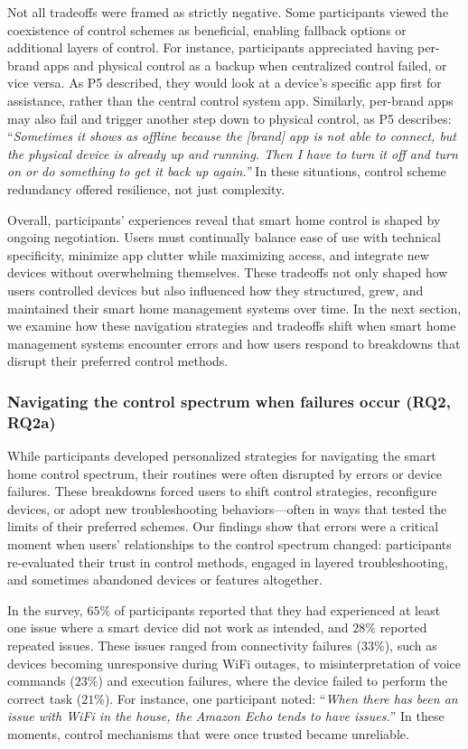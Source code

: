 Not all tradeoffs were framed as strictly negative. Some participants viewed the coexistence of control schemes as beneficial, enabling fallback options or additional layers of control. For instance, participants appreciated having per-brand apps and physical control as a backup when centralized control failed, or vice versa. As P5 described, they would look at a device's specific app first for assistance, rather than the central control system app. Similarly, per-brand apps may also fail and trigger another step down to physical control, as P5 describes: ``\textit{Sometimes it shows as offline because the [brand] app is not able to connect, but the physical device is already up and running. Then I have to turn it off and turn on or do something to get it back up again.''} In these situations, control scheme redundancy offered resilience, not just complexity.

Overall, participants' experiences reveal that smart home control is shaped by ongoing negotiation. Users must continually balance ease of use with technical specificity, minimize app clutter while maximizing access, and integrate new devices without overwhelming themselves. These tradeoffs not only shaped how users controlled devices but also influenced how they structured, grew, and maintained their smart home management systems over time. In the next section, we examine how these navigation strategies and tradeoffs shift when smart home management systems encounter errors and how users respond to breakdowns that disrupt their preferred control methods.

\subsubsection{Navigating the control spectrum when failures occur (RQ2, RQ2a)}
\label{cic:subsec:navigatingcontrol}

While participants developed personalized strategies for navigating the smart home control spectrum, their routines were often disrupted by errors or device failures. These breakdowns forced users to shift control strategies, reconfigure devices, or adopt new troubleshooting behaviors---often in ways that tested the limits of their preferred schemes. Our findings show that errors were a critical moment when users' relationships to the control spectrum changed: participants re-evaluated their trust in control methods, engaged in layered troubleshooting, and sometimes abandoned devices or features altogether.

In the survey, $65\%$ of participants reported that they had experienced at least one issue where a smart device did not work as intended, and $28\%$ reported repeated issues. These issues ranged from connectivity failures ($33\%$), such as devices becoming unresponsive during WiFi outages, to misinterpretation of voice commands ($23\%$) and execution failures, where the device failed to perform the correct task ($21\%$). For instance, one participant noted: ``\textit{When there has been an issue with WiFi in the house, the Amazon Echo tends to have issues.}'' In these moments, control mechanisms that were once trusted became unreliable.

